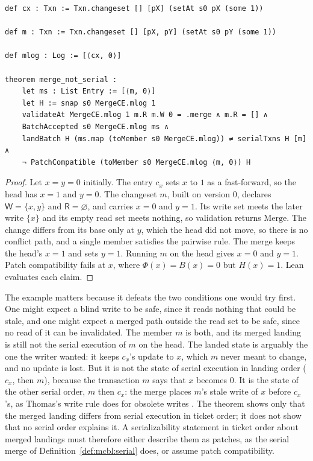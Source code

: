 \documentclass[11pt,letterpaper]{article}
\theoremstyle{definition}
\theoremstyle{remark}
\newcommand{\R}{\mathsf{R}}
\newcommand{\W}{\mathsf{W}}
\newcommand{\Mg}{\mathrm{Merge}}
\begin{document}
\begin{lstlisting}[language=Lean,caption={Patch compatibility cannot be dropped (\texttt{YonedaTx/Soundness.lean})},label={lst:mcbl:mergece}]
def cx : Txn := Txn.changeset [] [pX] (setAt s0 pX (some 1))

def m : Txn := Txn.changeset [] [pX, pY] (setAt s0 pY (some 1))

def mlog : Log := [⟨cx, 0⟩]

theorem merge_not_serial :
    let ms : List Entry := [⟨m, 0⟩]
    let H := snap s0 MergeCE.mlog 1
    validateAt MergeCE.mlog 1 m.R m.W 0 = .merge ∧ m.R = [] ∧
    BatchAccepted s0 MergeCE.mlog ms ∧
    landBatch H (ms.map (toMember s0 MergeCE.mlog)) ≠ serialTxns H [m] ∧
    ¬ PatchCompatible (toMember s0 MergeCE.mlog ⟨m, 0⟩) H
\end{lstlisting}

\begin{proof}
Let $x=y=0$ initially. The entry $c_x$ sets $x$ to $1$ as a fast-forward, so the head has $x=1$ and $y=0$. The changeset $m$, built on version 0, declares $\W=\{x,y\}$ and $\R=\varnothing$, and carries $x=0$ and $y=1$. Its write set meets the later write $\{x\}$ and its empty read set meets nothing, so validation returns $\Mg$. The change differs from its base only at $y$, which the head did not move, so there is no conflict path, and a single member satisfies the pairwise rule. The merge keeps the head's $x=1$ and sets $y=1$. Running $m$ on the head gives $x=0$ and $y=1$. Patch compatibility fails at $x$, where $\Phi(x)=B(x)=0$ but $H(x)=1$. Lean evaluates each claim.
\end{proof}

The example matters because it defeats the two conditions one would try first. One might expect a blind write to be safe, since it reads nothing that could be stale, and one might expect a merged path outside the read set to be safe, since no read of it can be invalidated. The member $m$ is both, and its merged landing is still not the serial execution of $m$ on the head. The landed state is arguably the one the writer wanted: it keeps $c_x$'s update to $x$, which $m$ never meant to change, and no update is lost. But it is not the state of serial execution in landing order ($c_x$, then $m$), because the transaction $m$ says that $x$ becomes $0$. It is the state of the other serial order, $m$ then $c_x$: the merge places $m$'s stale write of $x$ before $c_x$'s, as Thomas's write rule does for obsolete writes \cite[Section~4.5]{bhg1987}. The theorem shows only that the merged landing differs from serial execution in ticket order; it does not show that no serial order explains it. A serializability statement in ticket order about merged landings must therefore either describe them as patches, as the serial merge of Definition~\ref{def:mcbl:serial} does, or assume patch compatibility.
\end{document}
